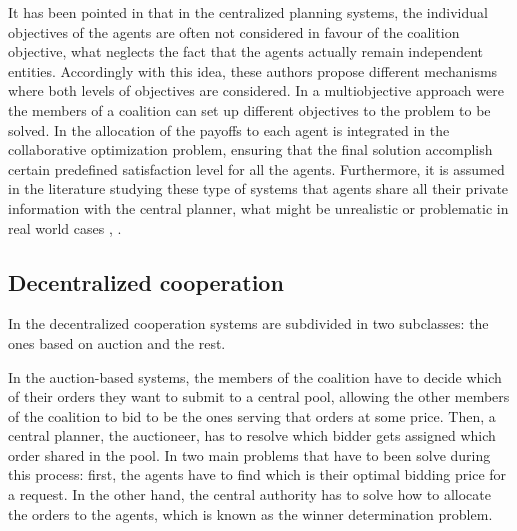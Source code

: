 \documentclass{article}
\begin{document}
It has been pointed in \textcite{DEFRYN2018891} that in the centralized planning systems, the individual objectives
of the agents are often not considered in favour of the coalition objective, what neglects the fact that the agents actually remain independent entities.  Accordingly with this idea,
these authors propose different mechanisms where both levels of objectives are
considered. In \cite{DEFRYN20191} a multiobjective approach were the members of a coalition can set up different objectives to the problem to be solved. In \cite{VANOVERMEIRE2014125} the allocation of the payoffs to each agent is integrated in the collaborative optimization problem, ensuring that the final solution accomplish certain predefined satisfaction level for all the agents. Furthermore, it is assumed
in the literature studying these type of systems that agents share all their private information
with the central planner, what might be unrealistic or problematic in real world cases \parencite{SERRANO2017}, \parencite{ZENG2015}.


\subsection{Decentralized cooperation}

In \cite{GANTERER2017} the decentralized cooperation systems are subdivided in two subclasses:  the ones based on auction and the rest. 

In the auction-based systems, the members of the coalition have to decide which of their orders they want to submit to a central pool, allowing the other members of the coalition to bid to be the ones serving that orders at some price. Then, a central planner, the auctioneer, has to resolve which bidder gets assigned which order shared in the pool. In \parencite{PAN2019} two main problems that have to been solve during this process: first, the agents have to find which is their optimal bidding price for a request. In the other hand, the central authority has to solve how to allocate the orders to the agents, which is known as the winner determination problem. 
\end{document}
